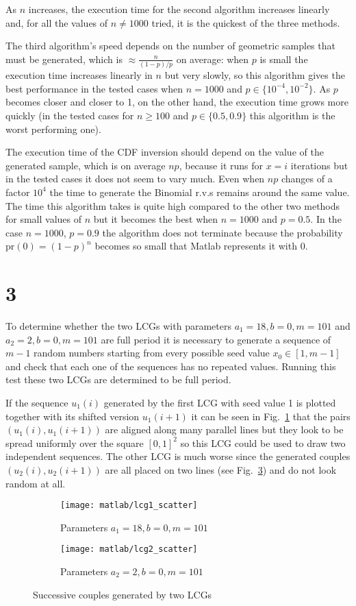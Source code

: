 \documentclass[a4paper,oneside]{article}
\begin{document}
As $n$ increases, the execution time for the second algorithm
increases linearly and, for all the values of $n \neq 1000$ tried, it
is the quickest of the three methods.

The third algorithm's speed depends on the number of geometric samples
that must be generated, which is $\approx \frac{n}{(1-p)/p}$ on
average: when $p$ is small the execution time increases linearly in
$n$ but very slowly, so this algorithm gives the best performance in
the tested cases when $n = 1000$ and $p \in \{10^{-4}, 10^{-2}\}$. As
$p$ becomes closer and closer to 1, on the other hand, the execution
time grows more quickly (in the tested cases for $n \geq 100$ and $p
\in \{0.5, 0.9\}$ this algorithm is the worst performing one).

The execution time of the CDF inversion should depend on the value of
the generated sample, which is on average $np$, because it runs for
$x=i$ iterations but in the tested cases it does not seem to vary
much.  Even when $np$ changes of a factor $10^4$ the time to generate
the Binomial r.v.s remains around the same value. The time this
algorithm takes is quite high compared to the other two methods for
small values of $n$ but it becomes the best when $n = 1000$ and $p =
0.5$. In the case $n = 1000$, $p=0.9$ the algorithm does not terminate
because the probability $\mathrm{pr}(0) = (1-p)^n$ becomes so small
that Matlab represents it with 0.
\section*{3}
To determine whether the two LCGs with parameters $a_1 = 18, b=0,
m=101$ and $a_2 = 2, b=0, m=101$ are full period it is necessary to
generate a sequence of $m-1$ random numbers starting from every
possible seed value $x_0 \in [1, m-1]$ and check that each one of the
sequences has no repeated values. Running this test these two LCGs are
determined to be full period.

If the sequence $u_1(i)$ generated by the first LCG with seed value 1
is plotted together with its shifted version $u_1(i+1)$ it can be seen
in Fig.~\ref{plot:lcg1_scatter} that the pairs $(u_1(i), u_1(i+1))$
are aligned along many parallel lines but they look to be spread
uniformly over the square $[0,1]^2$ so this LCG could be used to draw
two independent sequences. The other LCG is much worse since the
generated couples $(u_2(i), u_2(i+1))$ are all placed on two lines
(see Fig.~\ref{plot:lcg2_scatter}) and do not look random at all.
\begin{figure}[htbp]
  \centering
  \begin{subfigure}{0.5\textwidth}
    \centering
    \texttt{[image: matlab/lcg1\_scatter]}
    \caption{Parameters $a_1 = 18, b=0, m=101$}
    \label{plot:lcg1_scatter}
  \end{subfigure}%
  \begin{subfigure}{0.5\textwidth}
    \centering
    \texttt{[image: matlab/lcg2\_scatter]}
    \caption{Parameters $a_2 = 2, b=0, m=101$}
    \label{plot:lcg2_scatter}
  \end{subfigure}
  \caption{Successive couples generated by two LCGs}
\end{figure}
\end{document}
